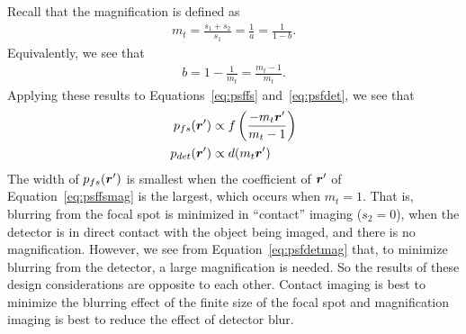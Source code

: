 \documentclass[mphy386-notes.tex]{subfiles}
\begin{document}
Recall that the magnification is defined as
\begin{align}
  m_t = \frac{s_1+s_2}{s_1} = \frac{1}{a} = \frac{1}{1-b}.
  \label{eq:mag1}
\end{align}
Equivalently, we see that
\begin{align}
  b = 1 - \frac{1}{m_t} = \frac{m_t - 1}{m_t}.
  \label{eq:mag2}
\end{align}
Applying these results to Equations~\ref{eq:psffs} and~\ref{eq:psfdet},
we see that
\begin{align}
  p_{fs}(\boldsymbol{r}') &\propto f\left(\frac{-m_t\boldsymbol{r}'}{m_t - 1}\right)\label{eq:psffsmag}\\
  p_{det}(\boldsymbol{r}') &\propto d(m_t\boldsymbol{r}')\label{eq:psfdetmag}
\end{align}
The width of $p_{fs}(\boldsymbol{r}')$ is smallest when the coefficient of $\boldsymbol{r}'$ of
Equation~\ref{eq:psffsmag} is the largest, which occurs when $m_t = 1$. That is, blurring
from the focal spot is minimized in ``contact'' imaging ($s_2 = 0$), when
the detector is in direct contact with the object being imaged, and there is no
magnification. However, we see from Equation~\ref{eq:psfdetmag} that, to minimize blurring
from the detector,  a large magnification is needed.  So the results of these design 
considerations are opposite to each other.  Contact imaging is best to minimize the blurring effect
of the finite size of the focal spot and magnification imaging is best to reduce the effect
of detector blur. \\
\end{document}
